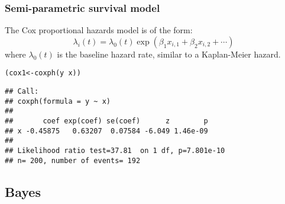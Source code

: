 \documentclass[color=usenames,dvipsnames]{beamer}\usepackage[]{graphicx}\usepackage[]{color}
\makeatletter
\newcommand{\hlopt}[1]{\textcolor[rgb]{0,0,0}{#1}}%
\newcommand{\hlstd}[1]{\textcolor[rgb]{0,0,0}{#1}}%
\newcommand{\hlkwb}[1]{\textcolor[rgb]{0,0.341,0.682}{#1}}%
\newcommand{\hlkwd}[1]{\textcolor[rgb]{0.004,0.004,0.506}{#1}}%
\newenvironment{kframe}{%
 \def\at@end@of@kframe{}%
 \ifinner\ifhmode%
  \def\at@end@of@kframe{\end{minipage}}%
  \begin{minipage}{\columnwidth}%
 \fi\fi%
 \def\FrameCommand##1{\hskip\@totalleftmargin \hskip-\fboxsep
 \colorbox{shadecolor}{##1}\hskip-\fboxsep
     \hskip-\linewidth \hskip-\@totalleftmargin \hskip\columnwidth}%
 \MakeFramed {\advance\hsize-\width
   \@totalleftmargin\z@ \linewidth\hsize
   \@setminipage}}%
 {\par\unskip\endMakeFramed%
 \at@end@of@kframe}
\newenvironment{knitrout}{}{} %
\makeatother
\begin{document}
\begin{frame}[fragile]
  \frametitle{Semi-parametric survival model}
  The Cox proportional hazards model is of the form:
  \[
    \lambda_i(t) = \lambda_0(t)\exp(\beta_1 x_{i,1} + \beta_2 x_{i,2} + \cdots)
  \]
  where $\lambda_0(t)$ is the baseline hazard rate, similar to a
  Kaplan-Meier hazard.
  \pause \vfill
\begin{knitrout}\scriptsize
{}\color{fgcolor}\begin{kframe}
\begin{alltt}
\hlstd{(cox1} \hlkwb{<-} \hlkwd{coxph}\hlstd{(y} \hlopt{~} \hlstd{x))}
\end{alltt}
\begin{verbatim}
## Call:
## coxph(formula = y ~ x)
## 
##       coef exp(coef) se(coef)      z        p
## x -0.45875   0.63207  0.07584 -6.049 1.46e-09
## 
## Likelihood ratio test=37.81  on 1 df, p=7.801e-10
## n= 200, number of events= 192
\end{verbatim}
\end{kframe}
\end{knitrout}
\end{frame}








\subsection{Bayes}
\end{document}
